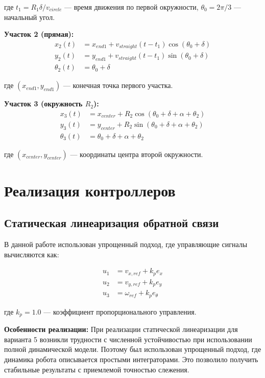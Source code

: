 где $t_1 = R_1 \delta / v_{circle}$ --- время движения по первой окружности, $\theta_0 = 2\pi/3$ --- начальный угол.

\textbf{Участок 2 (прямая):}
\begin{align}
x_2(t) &= x_{end1} + v_{straight}(t - t_1)\cos(\theta_0 + \delta) \\
y_2(t) &= y_{end1} + v_{straight}(t - t_1)\sin(\theta_0 + \delta) \\
\theta_2(t) &= \theta_0 + \delta
\end{align}

где $(x_{end1}, y_{end1})$ --- конечная точка первого участка.

\textbf{Участок 3 (окружность $R_2$):}
\begin{align}
x_3(t) &= x_{center} + R_2 \cos(\theta_0 + \delta + \alpha + \theta_2) \\
y_3(t) &= y_{center} + R_2 \sin(\theta_0 + \delta + \alpha + \theta_2) \\
\theta_3(t) &= \theta_0 + \delta + \alpha + \theta_2
\end{align}

где $(x_{center}, y_{center})$ --- координаты центра второй окружности.

\section{Реализация контроллеров}

\subsection{Статическая линеаризация обратной связи}

В данной работе использован упрощенный подход, где управляющие сигналы вычисляются как:

\begin{align}
u_1 &= v_{x,ref} + k_p e_x \\
u_2 &= v_{y,ref} + k_p e_y \\
u_3 &= \omega_{ref} + k_p e_\theta
\end{align}

где $k_p = 1.0$ --- коэффициент пропорционального управления.

\textbf{Особенности реализации:} При реализации статической линеаризации для варианта 5 возникли трудности с численной устойчивостью при использовании полной динамической модели. Поэтому был использован упрощенный подход, где динамика робота описывается простыми интеграторами. Это позволило получить стабильные результаты с приемлемой точностью слежения.

